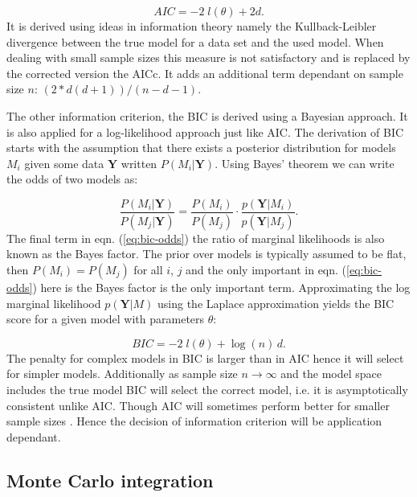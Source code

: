 \begin{equation}
  \label{eq:aic-def}
  AIC = -2 \;l(\theta) + 2 d. 
\end{equation}
It is derived using ideas in information theory namely the Kullback-Leibler divergence between the true model for a data set and the used model. When dealing with small sample sizes this measure is not satisfactory and is replaced by the corrected version the AICc. It adds an additional term dependant on sample size $n$: $(2 * d (d + 1)) / (n - d - 1)$.

The other information criterion, the BIC is derived using a Bayesian approach. It is also applied for a log-likelihood approach just like AIC. The derivation of BIC starts with the assumption that there exists a posterior distribution for models $M_i$ given some data $\mathbf{Y}$ written $P(M_i| \mathbf{Y})$. Using Bayes' theorem we can write the odds of two models as:

\begin{equation}
  \label{eq:bic-odds}
  \frac{P(M_i|\mathbf{Y})}{P(M_j|\mathbf{Y})} = \frac{P(M_i)}{P(M_j)} \cdot \frac{p(\mathbf{Y}|M_i)}{p(\mathbf{Y} |M_j)}.
\end{equation}
The final term in eqn. (\ref{eq:bic-odds}) the ratio of marginal likelihoods is also known as the Bayes factor. The prior over models is typically assumed to be flat, then $P(M_i) = P(M_j)$ for all $i$, $j$ and the only important in eqn. (\ref{eq:bic-odds}) here is the Bayes factor is the only important term. Approximating the log marginal likelihood $p(\mathbf{Y} | M)$ using the Laplace approximation yields the BIC score for a given model with parameters $\theta$:

\begin{equation}
  \label{eq:bic-def}
  BIC = -2 \; l(\theta) + \log(n) \,d. 
\end{equation}
The penalty for complex models in BIC is larger than in AIC hence it will select for simpler models. Additionally as sample size $n\rightarrow \infty$ and the model space includes the true model BIC will select the correct model, i.e. it is asymptotically consistent unlike AIC. Though AIC will sometimes perform better for smaller sample sizes \citep{hastie2001elements}. Hence the decision of information criterion will be application dependant. 

\subsection{Monte Carlo integration}
\label{sec:monte-carlo-integr}

